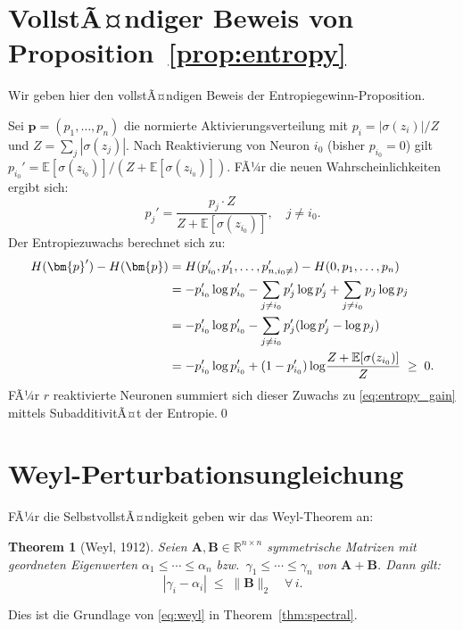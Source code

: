 ﻿\documentclass[12pt, a4paper, openany]{report}
\newtheorem{theorem}{Theorem}[chapter]
\newcommand{\R}{\mathbb{R}}
\newcommand{\E}{\mathbb{E}}
\newcommand{\abs}[1]{\left|#1\right|}
\begin{document}
\section{VollstÃ¤ndiger Beweis von Proposition~\ref{prop:entropy}}

Wir geben hier den vollstÃ¤ndigen Beweis der Entropiegewinn-Proposition.

Sei $\bm{p} = (p_1, \ldots, p_n)$ die normierte Aktivierungsverteilung
mit $p_i = |\sigma(z_i)| / Z$ und $Z = \sum_j |\sigma(z_j)|$.
Nach Reaktivierung von Neuron $i_0$ (bisher $p_{i_0} = 0$) gilt
$p_{i_0}' = \E[\sigma(z_{i_0})] / (Z + \E[\sigma(z_{i_0})])$.
FÃ¼r die neuen Wahrscheinlichkeiten ergibt sich:
\[
  p_j' = \frac{p_j \cdot Z}{Z + \E[\sigma(z_{i_0})]}, \quad j \neq i_0.
\]
Der Entropiezuwachs berechnet sich zu:
\begin{align}
  H(\bm{p}') - H(\bm{p})
  &= H(p_{i_0}', p_1', \ldots, p_{n, i_0\neq}') - H(0, p_1, \ldots, p_n) \notag \\
  &= -p_{i_0}'\log p_{i_0}'
     - \sum_{j \neq i_0} p_j' \log p_j'
     + \sum_{j \neq i_0} p_j \log p_j \notag \\
  &= -p_{i_0}'\log p_{i_0}'
     - \sum_{j \neq i_0} p_j' (\log p_j' - \log p_j) \notag \\
  &= -p_{i_0}'\log p_{i_0}'
     + (1 - p_{i_0}') \log\!\frac{Z + \E[\sigma(z_{i_0})]}{Z}
     \;\geq\; 0.
\end{align}
FÃ¼r $r$ reaktivierte Neuronen summiert sich dieser Zuwachs zu
\eqref{eq:entropy_gain} mittels SubadditivitÃ¤t der Entropie.\qed

\section{Weyl-Perturbationsungleichung}

FÃ¼r die SelbstvollstÃ¤ndigkeit geben wir das Weyl-Theorem an:

\begin{theorem}[Weyl, 1912]
Seien $\bm{A}, \bm{B} \in \R^{n\times n}$ symmetrische Matrizen mit
geordneten Eigenwerten $\alpha_1 \leq \cdots \leq \alpha_n$ bzw.\
$\gamma_1 \leq \cdots \leq \gamma_n$ von $\bm{A}+\bm{B}$.  Dann gilt:
\[
  \abs{\gamma_i - \alpha_i} \;\leq\; \|\bm{B}\|_2 \quad \forall\, i.
\]
\end{theorem}

Dies ist die Grundlage von \eqref{eq:weyl} in Theorem~\ref{thm:spectral}.
\end{document}
